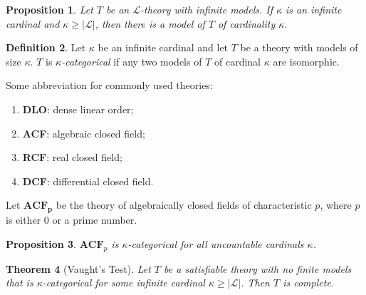 \documentclass{amsart}
\newtheorem{theorem}{Theorem}[subsection]
\newtheorem{lemma}[theorem]{Lemma}
\newtheorem{proposition}[theorem]{Proposition}
\theoremstyle{definition}
\newtheorem{definition}[theorem]{Definition}
\numberwithin{equation}{section}
\begin{document}
\begin{proposition}
  Let $T$ be an $\mathcal{L}$-theory with infinite models.
  If $\kappa$ is an infinite cardinal and $\kappa \ge |\mathcal{L}|$,
  then there is a model of $T$ of cardinality $\kappa$.
\end{proposition}

\begin{definition}
  Let $\kappa$ be an infinite cardinal and let $T$ be a theory with models of size $\kappa$.
  $T$ is \emph{$\kappa$-categorical} if any two models of $T$ of cardinal $\kappa$ are isomorphic.
\end{definition}

\begin{tcolorbox}
  Some abbreviation for commonly used theories:
  \begin{enumerate}[label = {}]
    \item \textbf{DLO}: dense linear order;
    \item \textbf{ACF}: algebraic closed field;
    \item \textbf{RCF}: real closed field;
    \item \textbf{DCF}: differential closed field.
  \end{enumerate}
\end{tcolorbox}

Let $\mathbf{ACF_p}$ be the theory of algebraically closed fields of characteristic $p$,
where $p$ is either $0$ or a prime number.

\begin{proposition} 
  $\mathbf{ACF}_p$ is $\kappa$-categorical for all uncountable cardinals $\kappa$.
\end{proposition}

\begin{theorem}[Vaught's Test]
  Let $T$ be a satisfiable theory with no finite models that is 
  $\kappa$-categorical for some infinite cardinal $\kappa \ge |\mathcal{L}|$.
  Then $T$ is complete.
\end{theorem}


\end{document}

